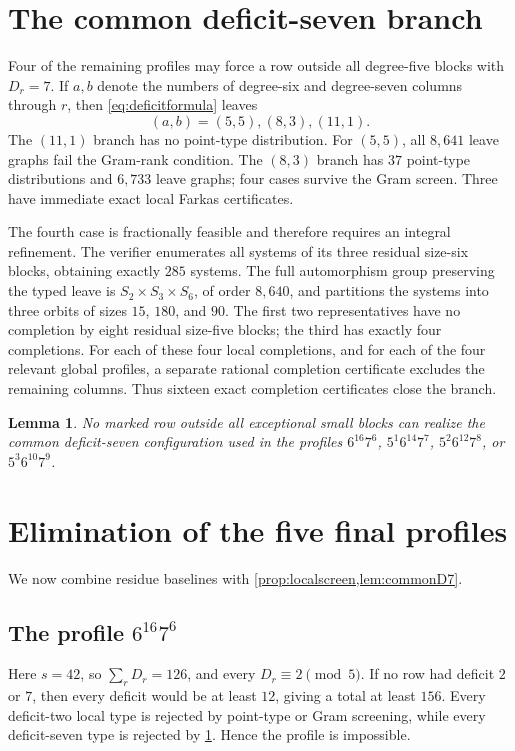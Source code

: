 \documentclass[11pt]{amsart}
\newtheorem{lemma}[theorem]{Lemma}
\begin{document}
\section{The common deficit-seven branch}
Four of the remaining profiles may force a row outside all degree-five blocks with $D_r=7$. If $a,b$ denote the numbers of degree-six and degree-seven columns through $r$, then \eqref{eq:deficitformula} leaves
\[
 (a,b)=(5,5),(8,3),(11,1).
\]
The $(11,1)$ branch has no point-type distribution. For $(5,5)$, all $8{,}641$ leave graphs fail the Gram-rank condition. The $(8,3)$ branch has $37$ point-type distributions and $6{,}733$ leave graphs; four cases survive the Gram screen. Three have immediate exact local Farkas certificates.

The fourth case is fractionally feasible and therefore requires an integral refinement. The verifier enumerates all systems of its three residual size-six blocks, obtaining exactly $285$ systems. The full automorphism group preserving the typed leave is $S_2\times S_3\times S_6$, of order $8{,}640$, and partitions the systems into three orbits of sizes $15$, $180$, and $90$. The first two representatives have no completion by eight residual size-five blocks; the third has exactly four completions. For each of these four local completions, and for each of the four relevant global profiles, a separate rational completion certificate excludes the remaining columns. Thus sixteen exact completion certificates close the branch.

\begin{lemma}\label{lem:commonD7}
No marked row outside all exceptional small blocks can realize the common deficit-seven configuration used in the profiles $6^{16}7^6$, $5^1 6^{14}7^7$, $5^2 6^{12}7^8$, or $5^3 6^{10}7^9$.
\end{lemma}

\section{Elimination of the five final profiles}
We now combine residue baselines with \cref{prop:localscreen,lem:commonD7}.

\subsection{The profile $6^{16}7^6$}
Here $s=42$, so $\sum_rD_r=126$, and every $D_r\equiv2\pmod5$. If no row had deficit $2$ or $7$, then every deficit would be at least $12$, giving a total at least $156$. Every deficit-two local type is rejected by point-type or Gram screening, while every deficit-seven type is rejected by \cref{lem:commonD7}. Hence the profile is impossible.
\end{document}
